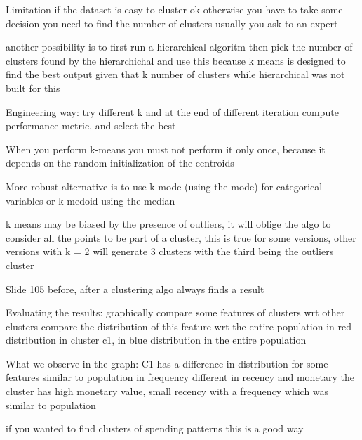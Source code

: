                     Limitation
                        if the dataset is easy to cluster ok 
                        otherwise you have to take some decision 
                        you need to find the number of clusters 
                        usually you ask to an expert

                        another possibility is to first run a hierarchical algoritm
                        then pick the number of clusters found by the hierarchichal and use this
                        because k means is designed to find the best output given that k number of clusters while hierarchical was not built for this 

                        Engineering way: try different k and at the end of different iteration compute performance metric, and select the best 

                        When you perform k-means you must not perform it only once, because it depends on the random initialization of the centroids

                        More robust alternative is to use k-mode (using the mode) for categorical variables or k-medoid using the median

                        k means may be biased by the presence of outliers, it will oblige the algo to consider all the points to be part of a cluster, this is true for some versions, other versions with k = 2 will generate 3 clusters with the third being the outliers cluster

                    Slide 105 
                        before, after 
                        a clustering algo always finds a result 

                    Evaluating the results:
                        graphically compare some features of clusters wrt other clusters 
                        compare the distribution of this feature wrt the entire population
                        in red distribution in cluster c1, in blue distribution in the entire population 

                        What we observe in the graph:
                            C1 has a difference in distribution for some features 
                                similar to population in frequency
                                different in recency and monetary
                                the cluster has high monetary value, small recency
                                with a frequency which was similar to population 

                            if you wanted to find clusters of spending patterns this is a good way 

